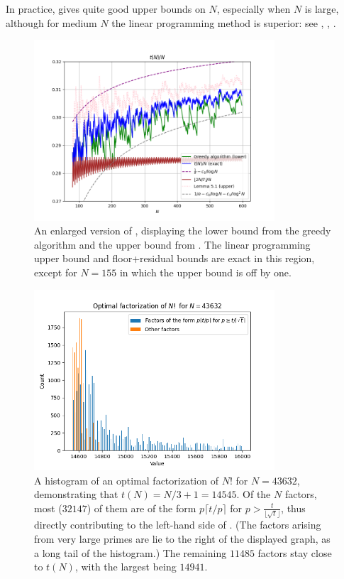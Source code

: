 \documentclass[12pt,a4paper,reqno]{amsart}
\numberwithin{equation}{section}
\theoremstyle{plain}
\theoremstyle{definition}
\begin{document}
In practice,  gives quite good upper bounds on $N$, especially when $N$ is large, although for medium $N$ the linear programming method is superior: see , , .
    
\begin{figure}
  \centering
  \includegraphics[width=0.8\textwidth]{newplot_600.png}
  \caption{An enlarged version of , displaying the lower bound from the greedy algorithm and the upper bound from .  The linear programming upper bound and floor+residual bounds are exact in this region, except for $N=155$ in which the upper bound is off by one.}\label{fig-zoom}
\end{figure}


\begin{figure}
  \centering
  \includegraphics[width=0.8\textwidth]{factors.png}
  \caption{A histogram of an optimal factorization of $N!$ for $N=43632$, demonstrating that $t(N) = N/3+1 = 14545$.  Of the $N$ factors, most ($\num{32147}$) of them are of the form $p \lceil t/p \rceil$ for $p > \frac{t}{\lfloor \sqrt{t} \rfloor}$, thus directly contributing to the left-hand side of .  (The factors arising from very large primes are lie to the right of the displayed graph, as a long tail of the histogram.)  The remaining $\num{11485}$ factors stay close to $t(N)$, with the largest being $\num{14941}$.
  }\label{fig-factor}
  \end{figure}
  
\end{document}
